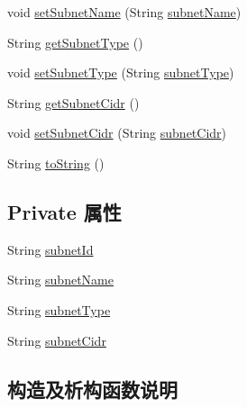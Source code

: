 \begin{DoxyCompactItemize}
\item 
void \mbox{\hyperlink{classcom_1_1example_1_1demo_1_1modular_1_1_subnet_ad6d728d580a6ef2a02d6bdb09a360afb}{set\+Subnet\+Name}} (String \mbox{\hyperlink{classcom_1_1example_1_1demo_1_1modular_1_1_subnet_abe0e0230f1c5bcde3df1a8b73e28124c}{subnet\+Name}})
\item 
String \mbox{\hyperlink{classcom_1_1example_1_1demo_1_1modular_1_1_subnet_a5fd4d5dd84854de35c321d62153f92ba}{get\+Subnet\+Type}} ()
\item 
void \mbox{\hyperlink{classcom_1_1example_1_1demo_1_1modular_1_1_subnet_a605e6e67173d6a475d179c9f2968e370}{set\+Subnet\+Type}} (String \mbox{\hyperlink{classcom_1_1example_1_1demo_1_1modular_1_1_subnet_a00aeb2821c490692871bc758e38236d2}{subnet\+Type}})
\item 
String \mbox{\hyperlink{classcom_1_1example_1_1demo_1_1modular_1_1_subnet_a9f6ba19f528151bfc38dcb91be26712d}{get\+Subnet\+Cidr}} ()
\item 
void \mbox{\hyperlink{classcom_1_1example_1_1demo_1_1modular_1_1_subnet_a53aedc0f87fc5e585946aa6f3965738d}{set\+Subnet\+Cidr}} (String \mbox{\hyperlink{classcom_1_1example_1_1demo_1_1modular_1_1_subnet_a63020f0a21f800ddf324568ce953ee5b}{subnet\+Cidr}})
\item 
String \mbox{\hyperlink{classcom_1_1example_1_1demo_1_1modular_1_1_subnet_a32c0a2037030151105b88c4d946977ac}{to\+String}} ()
\end{DoxyCompactItemize}
\subsection*{Private 属性}
\begin{DoxyCompactItemize}
\item 
String \mbox{\hyperlink{classcom_1_1example_1_1demo_1_1modular_1_1_subnet_a00d193dc9c931f8685f1aed499e2e4a7}{subnet\+Id}}
\item 
String \mbox{\hyperlink{classcom_1_1example_1_1demo_1_1modular_1_1_subnet_abe0e0230f1c5bcde3df1a8b73e28124c}{subnet\+Name}}
\item 
String \mbox{\hyperlink{classcom_1_1example_1_1demo_1_1modular_1_1_subnet_a00aeb2821c490692871bc758e38236d2}{subnet\+Type}}
\item 
String \mbox{\hyperlink{classcom_1_1example_1_1demo_1_1modular_1_1_subnet_a63020f0a21f800ddf324568ce953ee5b}{subnet\+Cidr}}
\end{DoxyCompactItemize}


\subsection{构造及析构函数说明}
\mbox{\label{classcom_1_1example_1_1demo_1_1modular_1_1_subnet_a3a708c56d6efdde55c25c8a5a403156b}} 
